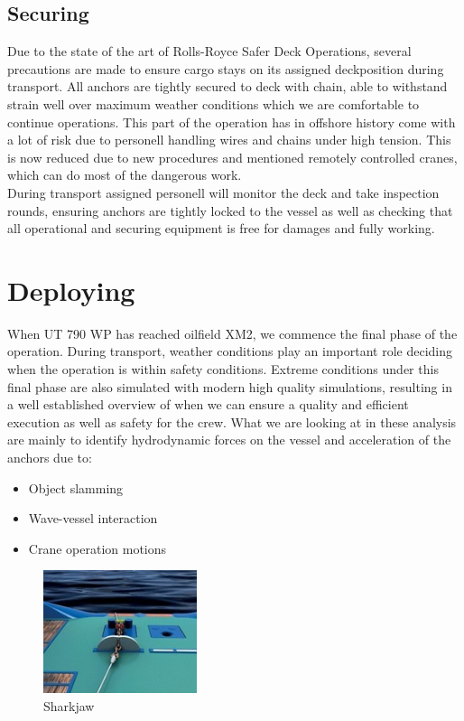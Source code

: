 \documentclass[a4paper,norsk]{article}
\begin{document}
\subsection*{Securing}
Due to the state of the art of Rolls-Royce Safer Deck Operations, several precautions are made to ensure cargo stays on its assigned deckposition during transport. All anchors are tightly secured to deck with chain, able to withstand strain well over maximum weather conditions which we are comfortable to continue operations. This part of the operation has in offshore history come with a lot of risk due to personell handling wires and chains under high tension. This is now reduced due to new procedures and mentioned remotely controlled cranes, which can do most of the dangerous work.\\
During transport assigned personell will monitor the deck and take inspection rounds, ensuring anchors are tightly locked to the vessel as well as checking that all operational and securing equipment is free for damages and fully working. 

\newpage
\section*{Deploying}
When UT 790 WP has reached oilfield XM2, we commence the final phase of the operation. During transport, weather conditions play an important role deciding when the operation is within safety conditions. Extreme conditions under this final phase are also simulated with modern high quality simulations, resulting in a well established overview of when we can ensure a quality and efficient execution as well as safety for the crew. What we are looking at in these analysis are mainly to identify hydrodynamic forces on the vessel and acceleration of the anchors due to:
\begin{itemize}
\item Object slamming
\item Wave-vessel interaction
\item Crane operation motions
\end{itemize}

\begin{figure}
  \vspace{-60pt}
  \begin{center}
    \includegraphics[width=0.4\textwidth]{sharkjaw.jpg}
  \end{center} 
  \vspace{-20pt}
  \caption{Sharkjaw}
  \vspace{-10pt}
\end{figure}
\end{document}
